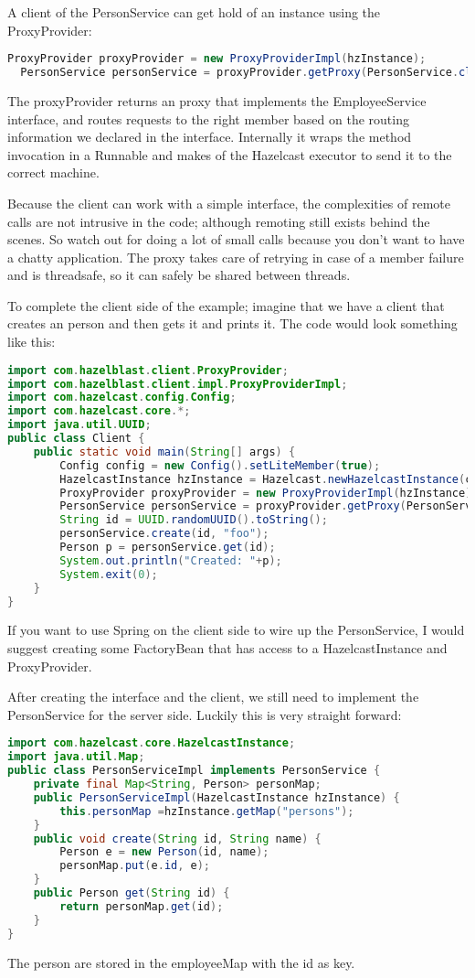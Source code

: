 A client of the PersonService can get hold of an instance using the ProxyProvider:
\begin{lstlisting}[language=java]
  ProxyProvider proxyProvider = new ProxyProviderImpl(hzInstance);
  PersonService personService = proxyProvider.getProxy(PersonService.class);
\end{lstlisting}
The proxyProvider returns an proxy that implements the EmployeeService interface, and routes requests to the right member based on the routing information we declared in the interface. Internally it wraps the method invocation in a Runnable and makes of the Hazelcast executor to send it to the correct machine.

Because the client can work with a simple interface, the complexities of remote calls are not intrusive in the code; although remoting still exists behind the scenes. So watch out for doing a lot of small calls because you don't want to have a chatty application. The proxy takes care of retrying in case of a member failure and is threadsafe, so it can safely be shared between threads. 

To complete the client side of the example; imagine that we have a client that creates an person and then gets it and prints it. The code would look something like this:
\begin{lstlisting}[language=java]
import com.hazelblast.client.ProxyProvider;
import com.hazelblast.client.impl.ProxyProviderImpl;
import com.hazelcast.config.Config;
import com.hazelcast.core.*;
import java.util.UUID;
public class Client {
    public static void main(String[] args) {
        Config config = new Config().setLiteMember(true);
        HazelcastInstance hzInstance = Hazelcast.newHazelcastInstance(config);
        ProxyProvider proxyProvider = new ProxyProviderImpl(hzInstance);
        PersonService personService = proxyProvider.getProxy(PersonService.class);
        String id = UUID.randomUUID().toString();
        personService.create(id, "foo");
        Person p = personService.get(id);
        System.out.println("Created: "+p);
        System.exit(0);
    }
}
\end{lstlisting}
If you want to use Spring on the client side to wire up the PersonService, I would suggest creating some FactoryBean that has access to a HazelcastInstance and ProxyProvider.

After creating the interface and the client, we still need to implement the PersonService for the server side. Luckily this is very straight forward:
\begin{lstlisting}[language=java]
import com.hazelcast.core.HazelcastInstance;
import java.util.Map;
public class PersonServiceImpl implements PersonService {
    private final Map<String, Person> personMap;
    public PersonServiceImpl(HazelcastInstance hzInstance) {
        this.personMap =hzInstance.getMap("persons");
    }
    public void create(String id, String name) {
        Person e = new Person(id, name);
        personMap.put(e.id, e);
    }
    public Person get(String id) {
        return personMap.get(id);
    }
}
\end{lstlisting}
The person are stored in the employeeMap with the id as key. 

